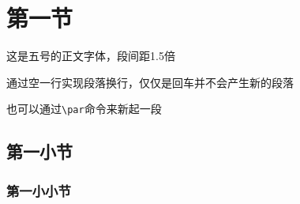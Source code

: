 \documentclass[supercite]{HustGraduTrans}
\begin{document}
    

    
    \section{第一节}
    这是五号的正文字体，段间距1.5倍
    
    通过空一行实现段落换行，仅仅是回车并不会产生新的段落
    \par 也可以通过\verb|\par|命令来新起一段
    \subsection{第一小节}
    \subsubsection{第一小小节}
\end{document}
